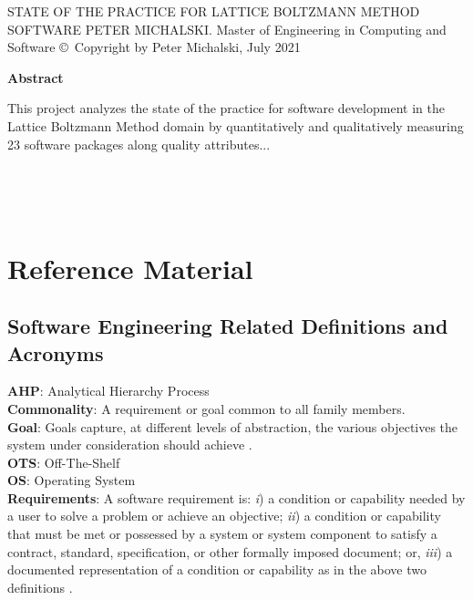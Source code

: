\documentclass[12pt, notitlepage]{article}
\newcommand{\fulltitle}{State of the Practice for Lattice Boltzmann Method Software}
\newcommand{\authorname}{Peter Michalski}
\begin{document}
\begin{singlespace}

\thesistitle
	{\MakeUppercase{\fulltitle}}
	{\MakeUppercase{\authorname}.}
	{Master of Engineering in Computing and Software}
	{\copyright \ Copyright by \authorname, July 2021}

\newpage
\thispagestyle{empty}
\begin{center}
	\textbf{\large Abstract}
\end{center}

This project analyzes the state of the practice for software development in the Lattice Boltzmann Method domain by quantitatively and qualitatively measuring 23 software packages along quality attributes...

\newpage
{}
\tableofcontents
{}

~\newpage

\listoffigures

\listoftables

~\newpage

\clearpage
\section*{Reference Material}

\subsection*{Software Engineering Related Definitions and Acronyms}

\noindent\textbf{AHP}: Analytical Hierarchy Process\\

\noindent\textbf{Commonality}: A requirement or goal common to all family members.\\

\noindent\textbf{Goal}: Goals capture, at different levels of abstraction, the various objectives the system under consideration should achieve \citep{van2001goal}.\\

\noindent\textbf{OTS}: Off-The-Shelf\\

\noindent\textbf{OS}: Operating System\\

\noindent\textbf{Requirements}: A software requirement is: \textit{i}) a condition or capability needed by a user to solve a problem or achieve an objective; \textit{ii}) a condition or capability that must be met or possessed by a system or system component to satisfy a contract, standard, specification, or other formally imposed document; or, \textit{iii}) a documented representation of a condition or capability as in the above two definitions \citep{thayer2000ieee}.\\


\end{singlespace}
\end{document}

